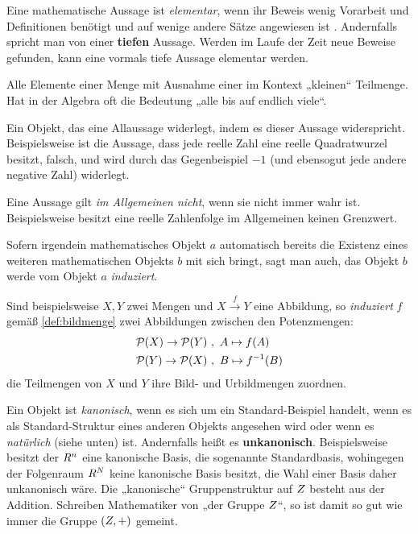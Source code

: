 \begin{description}[labelindent=0pt, leftmargin=0pt]
    \item[Elementar:] Eine mathematische Aussage ist \emph{elementar}, wenn ihr Beweis wenig Vorarbeit und Definitionen benötigt und auf wenige andere Sätze angewiesen ist . Andernfalls spricht man von einer \textbf{tiefen} Aussage. Werden im Laufe der Zeit neue Beweise gefunden, kann eine vormals tiefe Aussage elementar werden.

    \item[Fast alle:] Alle Elemente einer Menge mit Ausnahme einer im Kontext „kleinen“ Teilmenge. Hat in der Algebra oft die Bedeutung „alle bis auf endlich viele“.

    \item[Gegenbeispiel:] Ein Objekt, das eine Allaussage widerlegt, indem es dieser Aussage widerspricht. Beispielsweise ist die Aussage, dass jede reelle Zahl eine reelle Quadratwurzel besitzt, falsch, und wird durch das Gegenbeispiel $-1$ (und ebensogut jede andere negative Zahl) widerlegt.

    \item[Im Allgemeinen nicht:] Eine Aussage gilt \emph{im Allgemeinen nicht}, wenn sie nicht immer wahr ist. Beispielsweise besitzt eine reelle Zahlenfolge im Allgemeinen keinen Grenzwert.

    \item[Induzieren:]  Sofern irgendein mathematisches Objekt $a$ automatisch bereits die Existenz eines weiteren mathematischen Objekts $b$ mit sich bringt, sagt man auch, das Objekt $b$ werde vom Objekt $a$ \emph{induziert}.

    Sind beispielsweise $X,Y$ zwei Mengen und $X\xrightarrow{f} Y$ eine Abbildung, so \emph{induziert} $f$ gemäß \cref{def:bildmenge} zwei Abbildungen zwischen den Potenzmengen:
    \begin{align*}
        \mathcal P(X) \to \mathcal P(Y) \ & , \ A\mapsto f(A) \\
            \mathcal P(Y) \to \mathcal P(X) \ & , \ B\mapsto f^{-1}(B)
    \end{align*}
    die Teilmengen von $X$ und $Y$ ihre Bild- und Urbildmengen zuordnen.

    \item[Kanonisch:]  Ein Objekt ist \emph{kanonisch}, wenn es sich um ein Standard-Beispiel handelt, wenn es als Standard-Struktur eines anderen Objekts angesehen wird oder wenn es \emph{natürlich} (siehe unten) ist. Andernfalls heißt es \textbf{unkanonisch}. Beispielsweise besitzt der $\relax R^n$ eine kanonische Basis, die sogenannte Standardbasis, wohingegen der Folgenraum $\relax R^\relax N$ keine kanonische Basis besitzt, die Wahl einer Basis daher unkanonisch wäre. Die „kanonische“ Gruppenstruktur auf $\relax Z$ besteht aus der Addition. Schreiben Mathematiker von „der Gruppe $\relax Z$“, so ist damit so gut wie immer die Gruppe $(\relax Z,+)$ gemeint.


\end{description}
